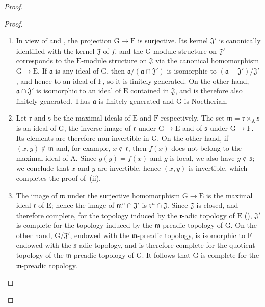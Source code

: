 \begin{proof}
\begin{proof}
\begin{enumerate}[label=(\roman*)]
  \item In view of  and , the projection $\mathrm{G}\to\mathrm{F}$ is surjective. Its kernel $\mathfrak{J}'$ is canonically identified with the kernel $\mathfrak{J}$ of $f$, and the $\mathrm{G}$-module structure on $\mathfrak{J}'$ corresponds to the $\mathrm{E}$-module structure on $\mathfrak{J}$ via the canonical homomorphism $\mathrm{G}\to\mathrm{E}$.
If $\mathfrak{a}$ is any ideal of $\mathrm{G}$, then $\mathfrak{a}/(\mathfrak{a}\cap\mathfrak{J}')$ is isomorphic to $(\mathfrak{a}+\mathfrak{J}')/\mathfrak{J}'$, and hence to an ideal of $\mathrm{F}$, so it is finitely generated. On the other hand, $\mathfrak{a}\cap\mathfrak{J}'$ is isomorphic to an ideal of $\mathrm{E}$ contained in $\mathfrak{J}$, and is therefore also finitely generated. Thus $\mathfrak{a}$ is finitely generated and $\mathrm{G}$ is Noetherian.
  \item Let $\mathfrak{r}$ and $\mathfrak{s}$ be the maximal ideals of $\mathrm{E}$ and $\mathrm{F}$ respectively. The set $\mathfrak{m}=\mathfrak{r}\times_{\mathrm{A}}\mathfrak{s}$ is an ideal of $\mathrm{G}$, the inverse image of $\mathfrak{r}$ under $\mathrm{G}\to\mathrm{E}$ and of $\mathfrak{s}$ under $\mathrm{G}\to\mathrm{F}$. Its elements are therefore non-invertible in $\mathrm{G}$.
On the other hand, if $(x,y)\notin\mathfrak{m}$ and, for example, $x\notin\mathfrak{r}$, then $f(x)$ does not belong to the maximal ideal of $\mathrm{A}$. Since $g(y)=f(x)$ and $g$ is local, we also have $y\notin\mathfrak{s}$; we
conclude that $x$ and $y$ are invertible, hence $(x,y)$ is invertible, which completes the proof of~(ii).
  \item The image of $\mathfrak{m}$ under the surjective homomorphism $\mathrm{G}\to\mathrm{E}$ is the maximal ideal $\mathfrak{r}$ of $\mathrm{E}$; hence the image of $\mathfrak{m}^n\cap\mathfrak{J}'$ is $\mathfrak{r}^n\cap\mathfrak{J}$. Since $\mathfrak{J}$ is closed, and therefore complete, for the topology induced by the $\mathfrak{r}$-adic topology of $\mathrm{E}$ (), $\mathfrak{J}'$ is complete for the topology induced by the $\mathfrak{m}$-preadic topology of $\mathrm{G}$.
On the other hand, $\mathrm{G}/\mathfrak{J}'$, endowed with the $\mathfrak{m}$-preadic topology, is isomorphic to $\mathrm{F}$ endowed with the $\mathfrak{s}$-adic topology, and is therefore complete for the quotient topology of the $\mathfrak{m}$-preadic topology of $\mathrm{G}$.
It follows that $\mathrm{G}$ is complete for the $\mathfrak{m}$-preadic topology.
\end{enumerate}
\end{proof}


\end{proof}

